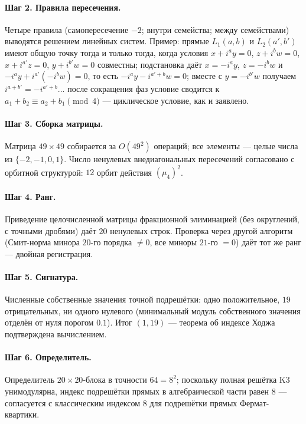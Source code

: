 \paragraph{Шаг 2. Правила пересечения.} Четыре правила
(самопересечение $-2$; внутри семейства; между семействами) выводятся
решением линейных систем. Пример: прямые $L_1(a,b)$ и $L_2(a',b')$
имеют общую точку тогда и только тогда, когда условия
$x+i^ay=0$, $z+i^bw=0$, $x+i^{a'}z=0$, $y+i^{b'}w=0$ совместны;
подстановка даёт $x=-i^ay$, $z=-i^bw$ и $-i^ay+i^{a'}(-i^bw)=0$,
то есть $-i^ay-i^{a'+b}w=0$; вместе с $y=-i^{b'}w$ получаем
$i^{a+b'}= -i^{a'+b}$... после сокращения фаз условие сводится к
$a_1+b_2\equiv a_2+b_1\pmod4$ --- циклическое условие, как и
заявлено.

\paragraph{Шаг 3. Сборка матрицы.} Матрица $49\times49$ собирается
за $O(49^2)$ операций; все элементы --- целые числа из
$\{-2,-1,0,1\}$. Число ненулевых внедиагональных пересечений
согласовано с орбитной структурой: $12$ орбит действия
$(\mu_4)^2$.

\paragraph{Шаг 4. Ранг.} Приведение целочисленной матрицы
фракционной элиминацией (без округлений, с точными дробями) даёт
$20$ ненулевых строк. Проверка через другой алгоритм (Смит-норма
минора $20$-го порядка $\ne0$, все миноры $21$-го $=0$) даёт тот же
ранг --- двойная регистрация.

\paragraph{Шаг 5. Сигнатура.} Численные собственные значения
точной подрешётки: одно положительное, $19$ отрицательных, ни
одного нулевого (минимальный модуль собственного значения
отделён от нуля порогом $0.1$). Итог $(1,19)$ --- теорема об
индексе Ходжа подтверждена вычислением.

\paragraph{Шаг 6. Определитель.} Определитель $20\times20$-блока
в точности $64=8^2$; поскольку полная решётка K3 унимодулярна,
индекс подрешётки прямых в алгебраической части равен $8$ ---
согласуется с классическим индексом $8$ для подрешётки прямых
Фермат-квартики.

